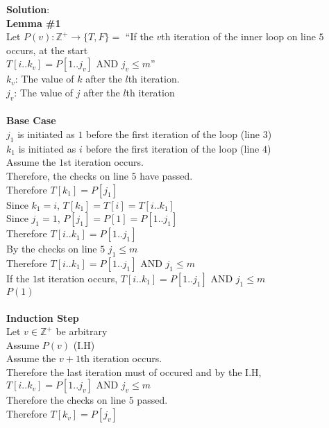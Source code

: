 \documentclass[11pt]{article}
\def\ints {{\mathbb Z}}
\newcommand{\And}{\mbox{ AND }}
\begin{document}
\begin{enumerate}
\begin{solution}
{\bf Solution}:\\
{\bf Lemma \#1}\\
Let $P(v): \ints^+ \rightarrow \{T, F\} = $ ``If the $v$th iteration of the inner loop on line $5$ occurs, at the start\\
$T[i..k_v] = P[1..j_v]\And j_v\le m$''\\
$k_v$: The value of $k$ after the $l$th iteration.\\
$j_v$: The value of $j$ after the $l$th iteration\\\\
{\bf Base Case}\\
$j_1$ is initiated as $1$ before the first iteration of the loop (line $3$)\\
$k_1$ is initiated as $i$ before the first iteration of the loop (line $4$)\\
\null\quad Assume the $1$st iteration occurs.\\
\null\quad Therefore, the checks on line $5$ have passed.\\
\null\quad Therefore $T[k_1] = P[j_1]$\\
\null\quad Since $k_1 = i$, $T[k_1] = T[i]=T[i..k_1]$\\
\null\quad Since $j_1 = 1$, $P[j_1] = P[1] = P[1..j_1]$\\
\null\quad Therefore $T[i..k_1] = P[1..j_1]$\\
\null\quad By the checks on line $5$ $j_1\le m$\\
\null\quad Therefore $T[i..k_1] = P[1..j_1]\And  j_1\le m$\\
If the $1$st iteration occurs, $T[i..k_1] = P[1..j_1]\And  j_1\le m$\\
$P(1)$\\\\
{\bf Induction Step}\\
\null\quad Let $v\in\ints^+$ be arbitrary\\
\null\qquad Assume $P(v)$ (I.H)\\
\null\qquad\quad Assume the $v+1$th iteration occurs.\\
\null\qquad\quad Therefore the last iteration must of occured and by the I.H, \\
\null\qquad\quad $T[i..k_v] = P[1..j_v]\And j_v\le m$\\
\null\qquad\quad Therefore the checks on line $5$ passed.\\
\null\qquad\quad Therefore $T[k_{v}] = P[j_{v}]$\\

\end{solution}
\end{enumerate}
\end{document}
